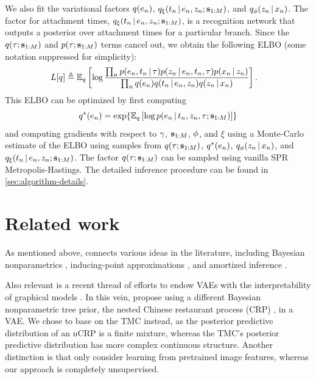 We also fit the variational factors
$q(e_n)$,
$q_{\xi}(t_n \,|\, e_n, z_n; \mathbf{s}_{1:M})$,
and
$q_\phi(z_n \,|\, x_n)$.
The factor for attachment times,
$q_{\xi}(t_n \,|\, e_n, z_n; \mathbf{s}_{1:M})$, is a
recognition network that outputs
a posterior over attachment times for a particular branch.
Since the $q(\tau; \mathbf{s}_{1:M})$ and $p(\tau; \mathbf{s}_{1:M})$ terms
cancel out, we obtain the following ELBO (some notation suppressed for simplicity):
\begin{equation}
    \begin{split}
    L[q] &\triangleq \mathbb{E}_q \left[\log \frac{\prod_n p(e_n, t_n \,|\, \tau) p(z_n \,|\, e_n, t_n, \tau)p(x_n \,|\, z_n)}{\prod_n q(e_n)q(t_n \,|\, e_n, z_n)q(z_n \,|\, x_n)}\right].
    \end{split}
\end{equation}
This ELBO can be optimized by first computing
\begin{equation}
    \q^*(e_\n) = \exp{\E_\q\left[\log \p(e_\n \given t_\n, \z_\n, \tree; \inducingpoints)\right]}
\end{equation}
and computing gradients with respect to $\gamma$, $\mathbf{s}_{1:M}$,
$\phi$, and $\xi$ using a Monte-Carlo estimate of the ELBO
using samples from $q(\tau; \mathbf{s}_{1:M})$, $q^*(e_n)$, $q_\phi(z_n \,|\, x_n)$, and $q_{\xi}(t_n \,|\, e_n, z_n; \mathbf{s}_{1:M})$.
The factor $q(\tau; \mathbf{s}_{1:M})$ can
be sampled using vanilla SPR Metropolis-Hastings. 
The detailed inference procedure can be found in \autoref{sec:algorithm-details}.

\section{Related work}
As mentioned above, \acronym\;connects various ideas in the literature, including Bayesian nonparametrics \citep{Boyles2012}, inducing-point approximations \citep[e.g.; ][]{Snelson2006,Tomczak2017},
and amortized inference \citep{Kingma2014, Rezende2014}.

Also relevant is a recent thread of efforts to endow VAEs with the interpretability of graphical models \citep[e.g.; ][]{Johnson2016,Lin2018}.
In this vein, \citet{Goyal2017} propose using a different Bayesian nonparametric tree prior, the nested Chinese restaurant process (CRP) \citep{Blei2010}, in a VAE.
We chose to base \acronym\;on the TMC instead, as the posterior predictive distribution of an nCRP is a finite mixture, whereas the TMC's posterior predictive distribution has more complex continuous structure.
Another distinction is that \citet{Goyal2017} only consider learning from pretrained image features, whereas our approach is completely unsupervised.

